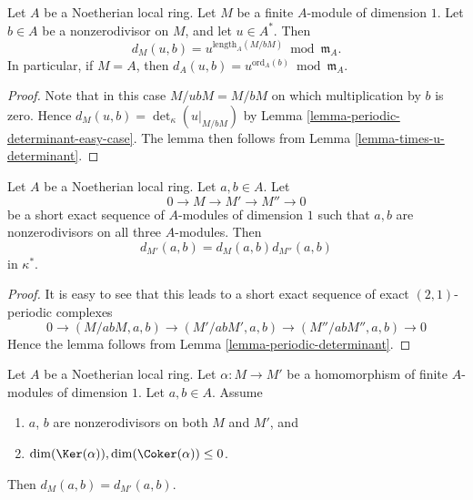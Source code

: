 \begin{lemma}
\label{lemma-symbol-when-one-is-a-unit}
Let $A$ be a Noetherian local ring.
Let $M$ be a finite $A$-module of dimension $1$.
Let $b \in A$ be a nonzerodivisor on $M$, and let $u \in A^*$.
Then
$$
d_M(u, b) = u^{\text{length}_A(M/bM)} \bmod \mathfrak m_A.
$$
In particular, if $M = A$, then
$d_A(u, b) = u^{\text{ord}_A(b)} \bmod \mathfrak m_A$.
\end{lemma}

\begin{proof}
Note that in this case $M/ubM = M/bM$ on which multiplication
by $b$ is zero. Hence $d_M(u, b) = \det_\kappa(u|_{M/bM})$
by Lemma \ref{lemma-periodic-determinant-easy-case}. The lemma
then follows from Lemma \ref{lemma-times-u-determinant}.
\end{proof}

\begin{lemma}
\label{lemma-symbol-short-exact-sequence}
Let $A$ be a Noetherian local ring.
Let $a, b \in A$.
Let
$$
0 \to M \to M' \to M'' \to 0
$$
be a short exact sequence of $A$-modules of dimension $1$
such that $a, b$ are nonzerodivisors on
all three $A$-modules.
Then
$$
d_{M'}(a, b) = d_M(a, b) d_{M''}(a, b)
$$
in $\kappa^*$.
\end{lemma}

\begin{proof}
It is easy to see that this leads to a short exact sequence
of exact $(2, 1)$-periodic complexes
$$
0 \to
(M/abM, a, b) \to
(M'/abM', a, b) \to
(M''/abM'', a, b) \to 0
$$
Hence the lemma follows from Lemma \ref{lemma-periodic-determinant}.
\end{proof}

\begin{lemma}
\label{lemma-symbol-compare-modules}
Let $A$ be a Noetherian local ring.
Let $\alpha : M \to M'$ be a homomorphism of
finite $A$-modules of dimension $1$.
Let $a, b \in A$. Assume
\begin{enumerate}
\item $a$, $b$ are nonzerodivisors on both $M$ and $M'$, and
\item $\dim(\Ker(\alpha)), \dim(\Coker(\alpha)) \leq 0$.
\end{enumerate}
Then $d_M(a, b) = d_{M'}(a, b)$.
\end{lemma}

